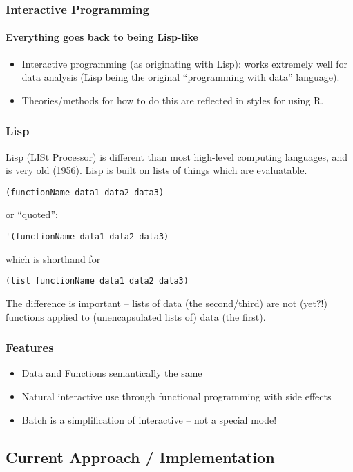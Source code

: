 \documentclass{beamer}
\begin{document}
\begin{frame}
  \frametitle{Interactive Programming}
  \framesubtitle{Everything goes back to being Lisp-like}
  \begin{itemize}
  \item Interactive programming (as originating with Lisp): works
    extremely well for data analysis (Lisp being the original
    ``programming with data'' language).
  \item Theories/methods for how to do this are reflected in styles
    for using R.
  \end{itemize}
\end{frame}

\begin{frame}[fragile]
  \frametitle{Lisp}

  Lisp (LISt Processor) is different than most high-level computing
  languages, and is very old (1956).  Lisp is built on lists of things
  which are evaluatable.
\begin{verbatim}
(functionName data1 data2 data3)
\end{verbatim}
  or ``quoted'':
\begin{verbatim}
'(functionName data1 data2 data3)
\end{verbatim}
  which is shorthand for 
\begin{verbatim}
(list functionName data1 data2 data3)
\end{verbatim}
  The difference is important -- lists of data (the second/third) are
  not (yet?!) functions applied to (unencapsulated lists of) data (the first).
\end{frame}

\begin{frame}
  \frametitle{Features}
  \begin{itemize}
  \item Data and Functions semantically the same
  \item Natural interactive use through functional programming with
    side effects
  \item Batch is a simplification of interactive -- not a special mode!
  \end{itemize}
\end{frame}


\subsection{Current Approach / Implementation}
\end{document}
